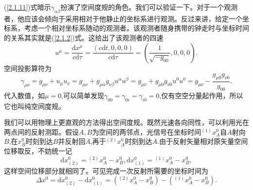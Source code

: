 \documentclass[11pt, a4paper, oneside, onecolumn]{ctexart}
\numberwithin{equation}{subsection}
\begin{document}
(\ref{2.1.11})式暗示$\gamma_{\alpha\beta}$扮演了空间度规的角色。我们可以验证一下。对于一个观测者，他应该会倾向于采用相对于他静止的坐标系进行观测。反过来讲，给定一个坐标系，考虑一个相对坐标系随动的观测者。该观测者随身携带的钟走时与坐标时间的关系其实就是(\ref{2.1.2})式。这给出了该观测者的四速
\begin{equation}
u^{\mu}=\frac{\mathrm{d}x^{\mu}}{c\mathrm{d}\tau}=\frac{\left(c\mathrm{d}t,0,0,0\right)}{c\mathrm{d}\tau}=\left(\frac{1}{\sqrt{-g_{00}}},0,0,0\right).
\end{equation}
空间投影算符为
\begin{equation}
\gamma_{\mu\nu}=g_{\mu\nu}+u_{\mu}u_{\nu}=g_{\mu\nu}+g_{\mu\alpha}g_{\nu\beta}u^{\alpha}u^{\beta}=g_{\mu\nu}+g_{\mu0}g_{\nu0}u^{0}u^{0}=g_{\mu\nu}-\frac{g_{\mu0}g_{\nu0}}{g_{00}}.
\end{equation}
代入数值，如$\mu=0$,可以简单发现$\gamma_{00}=\gamma_{0i}=\gamma_{i0}=0$,仅有空空分量起作用，所以它也叫纯空间度规。

我们可以用物理上更直观的方法得出空间度规。既然光速各向同性，可以利用光在两点间的反射测距。假设$A,B$为空间的两邻点，光信号在坐标时间${}^{\left(1\right)}x_{A}^{0}$自$A$射向$B$,在$x_{B}^{0}$时刻到达$B$并反射回$A$,再于${}^{\left(2\right)}x_{A}^{0}$时刻到达$A$.由于反射矢量相对原矢量空间位移取反，不妨统一记
\begin{equation}
\mathrm{d}x^{0}_{\left(2\right)}={}^{\left(2\right)}x_{A}^{0}-x_{B}^{0},\mathrm{d}x^{0}_{\left(1\right)}={}^{\left(1\right)}x_{A}^{0}-x_{B}^{0},
\end{equation}
这样空间位移部分就相同了。可见完成一次反射所需要的坐标时间为
\begin{equation}
\Delta{}x^{0}=\mathrm{d}x^{0}_{\left(2\right)}-\mathrm{d}x^{0}_{\left(1\right)}=\left({}^{\left(2\right)}x_{A}^{0}-x^{0}_{B}\right)-\left({}^{\left(1\right)}x_{A}^{0}-x^{0}_{B}\right).
\end{equation}
\end{document}
